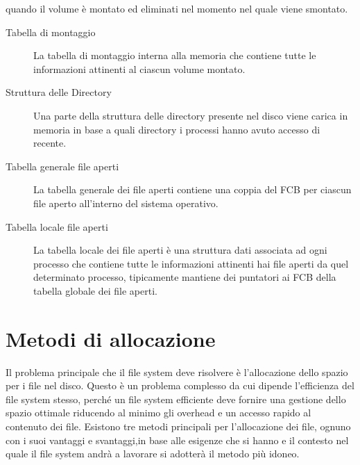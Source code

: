 	quando il volume è montato ed eliminati nel momento nel quale viene smontato. 
	    \begin{description}
	     \item[Tabella di montaggio]
	      La tabella di montaggio interna alla memoria che contiene tutte le informazioni attinenti al ciascun volume montato. 
 	    \end{description}
	    \begin{description}
	     \item[Struttura delle Directory]
	      Una parte della struttura delle directory presente nel disco viene carica in memoria in base a quali directory i processi hanno avuto accesso di recente.
 	    \end{description}
	    \begin{description}
	     \item[Tabella generale file aperti]
	      La tabella generale dei file aperti  contiene una coppia del FCB per ciascun file aperto all'interno del sistema operativo.  
 	    \end{description}
	      \begin{description}
	       \item[Tabella locale file aperti] 
		La tabella locale dei file aperti è una struttura dati associata ad ogni processo che contiene tutte le informazioni attinenti hai file aperti da quel determinato processo, tipicamente mantiene dei puntatori ai FCB della tabella globale dei file aperti. 
 	      \end{description}
         \section{Metodi di allocazione} 
         Il problema principale che il file system deve risolvere è l'allocazione dello spazio per i file nel disco. Questo è un problema complesso da cui dipende l'efficienza del file system stesso, perché un file system efficiente deve fornire una gestione dello spazio ottimale riducendo al minimo gli overhead e un accesso rapido al contenuto dei file. 
         Esistono tre metodi principali per l'allocazione dei file, ognuno con i suoi vantaggi e svantaggi,in base alle esigenze che si hanno e il contesto nel quale il file system andrà a lavorare si adotterà il metodo più idoneo.
         
